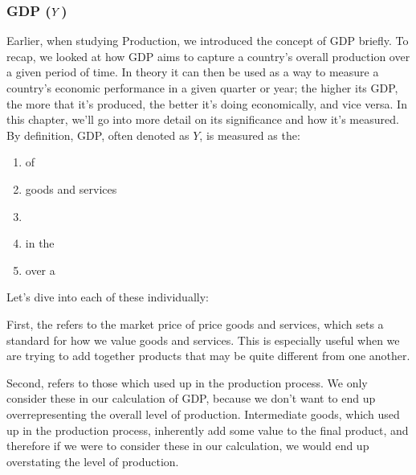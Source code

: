 \documentclass[letterpaper,10pt,english]{jupyterBook}
\begin{document}
\subsubsection{GDP (\protect\(Y\protect\))}
\label{\detokenize{content/09-macro/MacroChapter:gdp-y}}
\sphinxAtStartPar
Earlier, when studying Production, we introduced the concept of GDP briefly. To recap, we looked at how GDP aims to capture a country’s overall production over a given period of time. In theory it can then be used as a way to measure a country’s economic performance in a given quarter or year; the higher its GDP, the more that it’s produced, the better it’s doing economically, and vice versa. In this chapter, we’ll go into more detail on its significance and how it’s measured. By definition, GDP, often denoted as \(Y\), is measured as the:
\begin{enumerate}
%
\item {} 
\sphinxAtStartPar
{} of

\item {} 
\sphinxAtStartPar
{} goods and services

\item {} 
\sphinxAtStartPar
{}

\item {} 
\sphinxAtStartPar
in the 

\item {} 
\sphinxAtStartPar
over a 

\end{enumerate}

\sphinxAtStartPar
Let’s dive into each of these individually:

\sphinxAtStartPar
First, the  refers to the market price of price goods and services, which sets a standard for how we value goods and services. This is especially useful when we are trying to add together products that may be quite different from one another.

\sphinxAtStartPar
Second,  refers to those which  used up in the production process. We only consider these in our calculation of GDP, because we don’t want to end up overrepresenting the overall level of production. Intermediate goods, which  used up in the production process, inherently add some value to the final product, and therefore if we were to consider these in our calculation, we would end up overstating the level of production.
\end{document}
